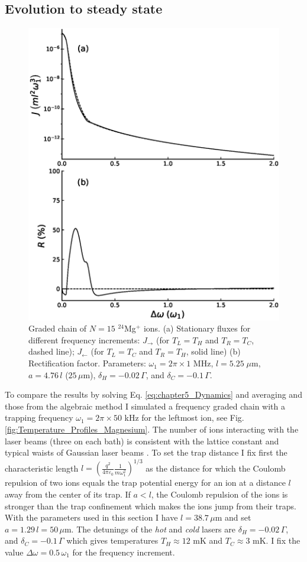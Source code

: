 \subsection{Evolution to steady state \label{Results_A}}

\begin{figure}
  \center
  \includegraphics[width=0.75\linewidth]{Figures/Graded_24Mg_FluxAndRectification_VS_FreqGradient.eps}
  \caption{Graded chain of $N=15$ $^{24}$Mg$^+$ ions. (a) Stationary fluxes for different frequency increments: $J_\rightarrow$   (for $T_L = T_H$ and $T_R = T_C$, dashed line); $J_\leftarrow$ (for $T_L = T_C$ and $T_R = T_H$, solid line) (b) Rectification factor. Parameters: $\omega_1 = 2 \pi \times 1$ MHz, $l = 5.25\;\mu$m, $a = 4.76\, l$ ($25\,\mu$m), $\delta_H = -0.02 \,\Gamma$, and $\delta_C = -0.1 \, \Gamma$.}
  \label{fig:RFG}
\end{figure}

To compare the results by solving Eq. \eqref{eq:chapter5_Dynamics} and averaging and those from the algebraic method I simulated a frequency graded chain with a trapping frequency $\omega_1 = 2\pi \times 50$ kHz for the leftmost ion, see Fig. \ref{fig:Temperature_Profiles_Magnesium}.  The number of ions interacting with the laser beams (three on each bath) is consistent with the lattice constant and typical waists of Gaussian laser beams \cite{Leupold2015,Lo2015}. To set the trap distance I fix first the characteristic length  $l =  \left(\frac{q^2}{4\pi\varepsilon_0}\frac{1}{m\omega_1^2}\right)^{1/3}$ as the distance for which the Coulomb repulsion of two ions equals the trap  potential energy for an ion at a distance
$l$ away from the center of its trap.
If $a<l$, the Coulomb repulsion of the ions is stronger than the trap confinement which makes the ions jump from their traps. With the parameters used in this section I have $l = 38.7\,\mu$m and set $a = 1.29 \,l=50\,\mu$m. The detunings of the \textit{hot} and \textit{cold} lasers are $\delta_H = -0.02 \, \Gamma$, and $\delta_C = -0.1 \, \Gamma$ which gives temperatures $T_H \approx 12$ mK and $T_C \approx 3$ mK. I fix the value $\Delta\omega = 0.5 \, \omega_1$ for the frequency increment.


